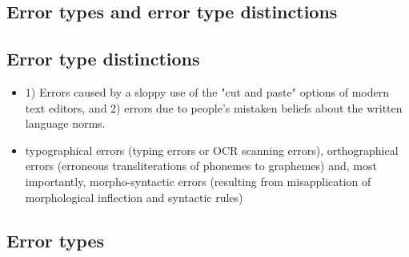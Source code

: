 \documentclass[a4paper,english,12pt]{article}
\begin{document}
\begin{spacing}{1.0}
\section{Error types and error type distinctions}

\subsection{Error type distinctions}

\begin{itemize}
\item 1) Errors caused by a sloppy use of the "cut and paste" options of modern text editors, and 2) errors due to people's mistaken beliefs about the written language norms. \citet{Hagen2001a}
\item typographical errors (typing errors or OCR scanning errors), orthographical errors (erroneous transliterations of phonemes to graphemes) and, most importantly, morpho-syntactic errors (resulting from misapplication of morphological inflection and syntactic rules) \citet{Vosse1992}
\end{itemize}

\subsection{Error types}


\end{spacing}
\end{document}
